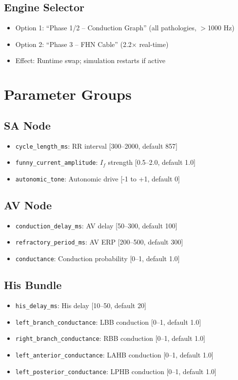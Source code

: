 \documentclass[12pt,oneside,a4paper]{book}
\newcommand{\code}[1]{\texttt{#1}}
\begin{document}
\subsection{Engine Selector}
\begin{itemize}
  \item Option 1: ``Phase 1/2 -- Conduction Graph'' (all pathologies, $>$1000 Hz)
  \item Option 2: ``Phase 3 -- FHN Cable'' (2.2× real-time)
  \item Effect: Runtime swap; simulation restarts if active
\end{itemize}

\section{Parameter Groups}

\subsection{SA Node}
\begin{itemize}
  \item \code{cycle\_length\_ms}: RR interval [300--2000, default 857]
  \item \code{funny\_current\_amplitude}: $I_f$ strength [0.5--2.0, default 1.0]
  \item \code{autonomic\_tone}: Autonomic drive [-1 to +1, default 0]
\end{itemize}

\subsection{AV Node}
\begin{itemize}
  \item \code{conduction\_delay\_ms}: AV delay [50--300, default 100]
  \item \code{refractory\_period\_ms}: AV ERP [200--500, default 300]
  \item \code{conductance}: Conduction probability [0--1, default 1.0]
\end{itemize}

\subsection{His Bundle}
\begin{itemize}
  \item \code{his\_delay\_ms}: His delay [10--50, default 20]
  \item \code{left\_branch\_conductance}: LBB conduction [0--1, default 1.0]
  \item \code{right\_branch\_conductance}: RBB conduction [0--1, default 1.0]
  \item \code{left\_anterior\_conductance}: LAHB conduction [0--1, default 1.0]
  \item \code{left\_posterior\_conductance}: LPHB conduction [0--1, default 1.0]
\end{itemize}
\end{document}

